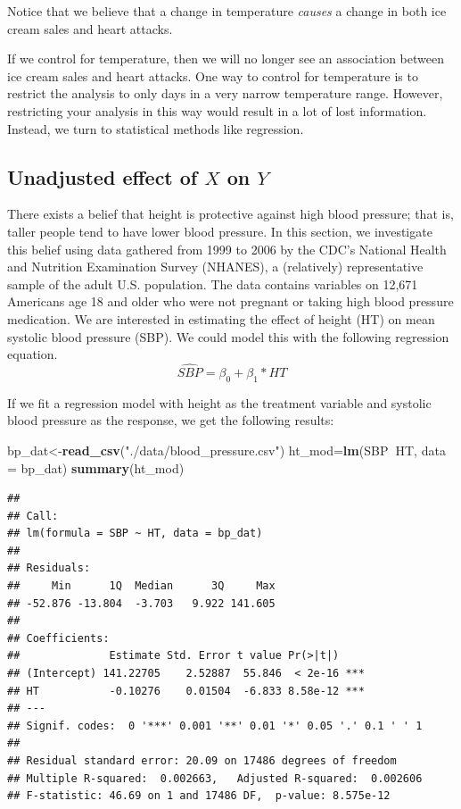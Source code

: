 \documentclass[]{book}
\newenvironment{Shaded}{\begin{snugshade}}{\end{snugshade}}
\newcommand{\DataTypeTok}[1]{\textcolor[rgb]{0.13,0.29,0.53}{#1}}
\newcommand{\KeywordTok}[1]{\textcolor[rgb]{0.13,0.29,0.53}{\textbf{#1}}}
\newcommand{\NormalTok}[1]{#1}
\newcommand{\OperatorTok}[1]{\textcolor[rgb]{0.81,0.36,0.00}{\textbf{#1}}}
\newcommand{\StringTok}[1]{\textcolor[rgb]{0.31,0.60,0.02}{#1}}
\begin{document}
Notice that we believe that a change in temperature \emph{causes} a change in both ice cream sales and heart attacks.

If we control for temperature, then we will no longer see an association between ice cream sales and heart attacks. One way to control for temperature is to restrict the analysis to only days in a very narrow temperature range. However, restricting your analysis in this way would result in a lot of lost information. Instead, we turn to statistical methods like regression.

\hypertarget{unadjusted-effect-of-x-on-y}{%
\subsection{\texorpdfstring{Unadjusted effect of \(X\) on \(Y\)}{Unadjusted effect of X on Y}}\label{unadjusted-effect-of-x-on-y}}

There exists a belief that height is protective against high blood pressure; that is, taller people tend to have lower blood pressure. In this section, we investigate this belief using data gathered from 1999 to 2006 by the CDC's National Health and Nutrition Examination Survey (NHANES), a (relatively) representative sample of the adult U.S. population. The data contains variables on 12,671 Americans age 18 and older who were not pregnant or taking high blood pressure medication. We are interested in estimating the effect of height (HT) on mean systolic blood pressure (SBP). We could model this with the following regression equation.
\[\widehat{SBP}=\beta_0+\beta_1*HT\]

If we fit a regression model with height as the treatment variable and systolic blood pressure as the response, we get the following results:

\begin{Shaded}
\begin{Highlighting}[]
\NormalTok{bp_dat<-}\KeywordTok{read_csv}\NormalTok{(}\StringTok{"./data/blood_pressure.csv"}\NormalTok{)}
\NormalTok{ht_mod=}\KeywordTok{lm}\NormalTok{(SBP}\OperatorTok{~}\NormalTok{HT,}
         \DataTypeTok{data =}\NormalTok{ bp_dat)}
\KeywordTok{summary}\NormalTok{(ht_mod)}
\end{Highlighting}
\end{Shaded}

\begin{verbatim}
## 
## Call:
## lm(formula = SBP ~ HT, data = bp_dat)
## 
## Residuals:
##     Min      1Q  Median      3Q     Max 
## -52.876 -13.804  -3.703   9.922 141.605 
## 
## Coefficients:
##              Estimate Std. Error t value Pr(>|t|)    
## (Intercept) 141.22705    2.52887  55.846  < 2e-16 ***
## HT           -0.10276    0.01504  -6.833 8.58e-12 ***
## ---
## Signif. codes:  0 '***' 0.001 '**' 0.01 '*' 0.05 '.' 0.1 ' ' 1
## 
## Residual standard error: 20.09 on 17486 degrees of freedom
## Multiple R-squared:  0.002663,   Adjusted R-squared:  0.002606 
## F-statistic: 46.69 on 1 and 17486 DF,  p-value: 8.575e-12
\end{verbatim}
\end{document}

